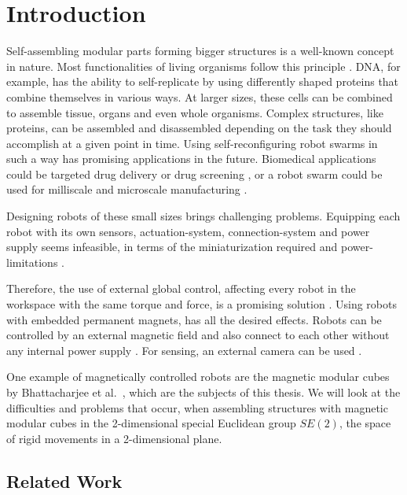 \chapter{Introduction}
\label{chap:intro}

Self-assembling modular parts forming bigger structures is a well-known concept in nature.
Most functionalities of living organisms follow this principle \cite{bishop2005}.
DNA, for example, has the ability to self-replicate by using differently shaped proteins that combine themselves in various ways.
At larger sizes, these cells can be combined to assemble tissue, organs and even whole organisms.
Complex structures, like proteins, can be assembled and disassembled depending on the task they should accomplish at a given point in time. 
Using self-reconfiguring robot swarms in such a way has promising applications in the future.
Biomedical applications could be targeted drug delivery or drug screening \cite{sitti2015}, or a robot swarm could be used for milliscale and microscale manufacturing \cite{pelrine2016}.

Designing robots of these small sizes brings challenging problems.
Equipping each robot with its own sensors, actuation-system, connection-system and power supply seems infeasible, in terms of the miniaturization required and power-limitations \cite{white2007}.

Therefore, the use of external global control, affecting every robot in the workspace with the same torque and force, is a promising solution \cite{white2007}.
Using robots with embedded permanent magnets, has all the desired effects.
Robots can be controlled by an external magnetic field and also connect to each other without any internal power supply \cite{saab2019}.
For sensing, an external camera can be used \cite{Lu2023}.

One example of magnetically controlled robots are the magnetic modular cubes by Bhattacharjee et al.\ \cite{Bhattacharjee2022}, which are the subjects of this thesis.
We will look at the difficulties and problems that occur, when assembling structures with magnetic modular cubes in the 2-dimensional special Euclidean group $\textit{SE}(2)$, the space of rigid movements in a 2-dimensional plane.

\newpage

\section{Related Work}


